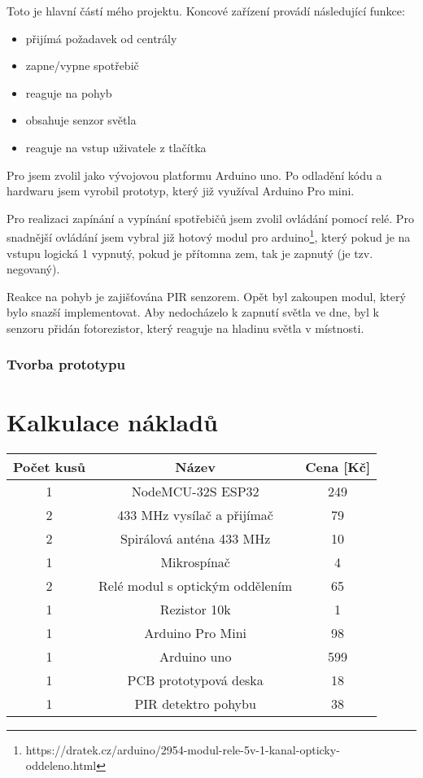 \documentclass[11pt,a4paper,twoside,openright]{report}
\begin{document}
Toto je hlavní částí mého projektu. Koncové zařízení provádí následující funkce:

\begin{itemize}
	\item přijímá požadavek od centrály
	\item zapne/vypne spotřebič
	\item reaguje na pohyb
	\item obsahuje senzor světla 
	\item reaguje na vstup uživatele z tlačítka
\end{itemize}

Pro  jsem zvolil jako vývojovou platformu Arduino uno. Po odladění kódu a hardwaru jsem vyrobil prototyp, který již využíval Arduino Pro mini. 


Pro realizaci zapínání a vypínání spotřebičů jsem zvolil ovládání pomocí relé. Pro snadnější ovládání jsem vybral již hotový modul pro arduino\footnote{https://dratek.cz/arduino/2954-modul-rele-5v-1-kanal-opticky-oddeleno.html}, který pokud je na vstupu logická 1 vypnutý, pokud je přítomna zem, tak je zapnutý (je tzv. negovaný).


Reakce na pohyb je zajišťována PIR senzorem. Opět byl zakoupen modul, který bylo snazší implementovat. Aby nedocházelo k zapnutí světla ve dne, byl k senzoru přidán fotorezistor, který reaguje na hladinu světla v místnosti.


\subsubsection{Tvorba prototypu}



\section{Kalkulace nákladů}
\begin{tabular}{|c|c|c|}
	\hline
	Počet kusů & Název & Cena [Kč] \\
	\hline
	1 & NodeMCU-32S ESP32 & 249  \\
	\hline
	2 & 433 MHz vysílač a přijímač & 79 \\
	\hline
	2 & Spirálová anténa 433 MHz & 10 \\
	\hline
	1 & Mikrospínač & 4 \\
	\hline
	2 & Relé modul s optickým oddělením & 65 \\
	\hline
	1 & Rezistor 10k & 1 \\
	\hline
	1 & Arduino Pro Mini & 98 \\
	\hline
	1 & Arduino uno & 599 \\
	\hline
	1 & PCB prototypová deska & 18 \\
	\hline
	1 & PIR detektro pohybu & 38 \\
	\hline
\end{tabular}
\end{document}
